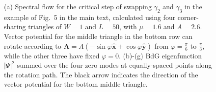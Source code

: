 \documentclass[aps,prb,showpacs,amsmath,amssymb,superscriptaddress]{revtex4-2}
\let\oldhat\hat
\renewcommand{\hat}[1]{\oldhat{\mathbf{#1}}}
\begin{document}
\begin{figure}
  \caption{(a) Spectral flow for the critical step of swapping $\gamma_2$ and $\gamma_3$ in the example of Fig.~5 in the main text, calculated using four corner-sharing triangles of $W=1$ and $L=50$, with $\mu=1.6$ and $A=2.6$. Vector potential for the middle triangle in the bottom row can rotate according to $\mathbf A = A(-\sin\varphi \hat{x} + \cos\varphi \hat{y})$ from $\varphi = \frac{\pi}{6}$ to $\frac{\pi}{3}$, while the other three have fixed $\varphi = 0$. (b)-(g) BdG eigenfunction $|\Psi|^2$ summed over the four zero modes at equally-spaced points along the rotation path. The black arrow indicates the direction of the vector potential for the bottom middle triangle.}\label{fig: supp braiding}
\end{figure}


\end{document}
